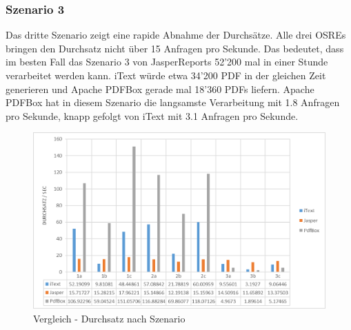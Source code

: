 \documentclass[main.tex]{subfiles}
\begin{document}
\subsubsection{Szenario 3}
Das dritte Szenario zeigt eine rapide Abnahme der Durchsätze. Alle drei OSREs bringen den Durchsatz nicht über 15 Anfragen pro Sekunde. Das bedeutet, dass im besten Fall das Szenario 3 von JasperReports 52'200 mal in einer Stunde verarbeitet werden kann. iText würde etwa 34'200 PDF in der gleichen Zeit generieren und Apache PDFBox gerade mal 18'360 PDFs liefern. 
Apache PDFBox hat in diesem Szenario die langsamste Verarbeitung mit 1.8 Anfragen pro Sekunde, knapp gefolgt von iText mit 3.1 Anfragen pro Sekunde. 

\begin{figure}[H]
\includegraphics[width=\textwidth]{mainpart/4_analyse_img/VglDurchSzen.png}
 \caption{Vergleich - Durchsatz nach Szenario}
 \label{figure:throughputSzen}
\end{figure}
\end{document}

